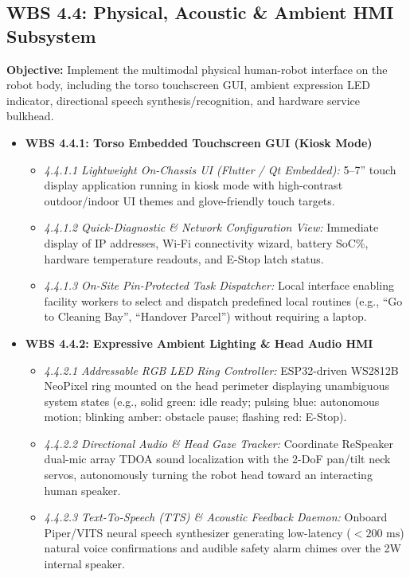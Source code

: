 \documentclass[10pt,a4paper]{article}
\begin{document}
\subsection{WBS 4.4: Physical, Acoustic \& Ambient HMI Subsystem}
\textbf{Objective:} Implement the multimodal physical human-robot interface on the robot body, including the torso touchscreen GUI, ambient expression LED indicator, directional speech synthesis/recognition, and hardware service bulkhead.

\begin{itemize}[leftmargin=1.5em]
    \item \textbf{WBS 4.4.1: Torso Embedded Touchscreen GUI (Kiosk Mode)}
    \begin{itemize}[leftmargin=1.2em]
        \item \emph{4.4.1.1 Lightweight On-Chassis UI (Flutter / Qt Embedded):} 5--7'' touch display application running in kiosk mode with high-contrast outdoor/indoor UI themes and glove-friendly touch targets.
        \item \emph{4.4.1.2 Quick-Diagnostic \& Network Configuration View:} Immediate display of IP addresses, Wi-Fi connectivity wizard, battery SoC\%, hardware temperature readouts, and E-Stop latch status.
        \item \emph{4.4.1.3 On-Site Pin-Protected Task Dispatcher:} Local interface enabling facility workers to select and dispatch predefined local routines (e.g., ``Go to Cleaning Bay'', ``Handover Parcel'') without requiring a laptop.
    \end{itemize}

    \item \textbf{WBS 4.4.2: Expressive Ambient Lighting \& Head Audio HMI}
    \begin{itemize}[leftmargin=1.2em]
        \item \emph{4.4.2.1 Addressable RGB LED Ring Controller:} ESP32-driven WS2812B NeoPixel ring mounted on the head perimeter displaying unambiguous system states (e.g., solid green: idle ready; pulsing blue: autonomous motion; blinking amber: obstacle pause; flashing red: E-Stop).
        \item \emph{4.4.2.2 Directional Audio \& Head Gaze Tracker:} Coordinate ReSpeaker dual-mic array TDOA sound localization with the 2-DoF pan/tilt neck servos, autonomously turning the robot head toward an interacting human speaker.
        \item \emph{4.4.2.3 Text-To-Speech (TTS) \& Acoustic Feedback Daemon:} Onboard Piper/VITS neural speech synthesizer generating low-latency ($<200\text{ ms}$) natural voice confirmations and audible safety alarm chimes over the 2W internal speaker.
    \end{itemize}


\end{itemize}
\end{document}
